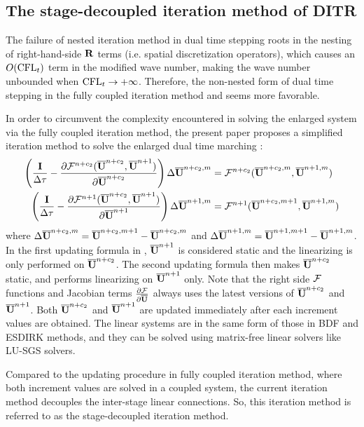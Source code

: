 \subsection{The stage-decoupled iteration method of DITR}

The failure of nested iteration method in dual time stepping
roots in the nesting of right-hand-side $\mathbf{R}$ terms
(i.e. spatial  discretization operators), which
causes an $O(\text{CFL}_t)$ term in the modified wave number,
making the wave number unbounded when $\text{CFL}_t\rightarrow + \infty$.
Therefore, the non-nested form of dual time stepping in
the fully coupled iteration method  and 
seems more favorable.

In order to circumvent the complexity encountered in solving the enlarged
system via the fully coupled iteration method, the present paper
proposes a simplified iteration method to solve the enlarged dual time marching
:
\begin{equation}
    \begin{aligned}
        \left(\frac{\eye}{\inc\tau} -
        \partialderivative{\FF^{n+c_2}(\uu^{n+c_2}, \uu^{n+1})}{\uu^{n+c_2}}  \right)
        \inc\uu^{n+c_2,m} & = \FF^{n+c_2}(\uu^{n+c_2,m}, \uu^{n+1,m}) \\
        \left(\frac{\eye}{\inc\tau} -
        \partialderivative{\FF^{n+1}(\uu^{n+c_2}, \uu^{n+1})}{\uu^{n+1}}  \right)
        \inc\uu^{n+1,m}   & = \FF^{n+1}(\uu^{n+c_2,m+1}, \uu^{n+1,m}) \\
    \end{aligned}
    \label{eq:DITRSDS}
\end{equation}
where ${\Delta} \overline{\mathbf{U}}^{n+c_2,m} = \overline{\mathbf{U}}^{n+c_2,m+1} - \overline{\mathbf{U}}^{n+c_2,m}$ and
${\Delta} \overline{\mathbf{U}}^{n+1,m} = \overline{\mathbf{U}}^{n+1,m+1} - \overline{\mathbf{U}}^{n+1,m}$.
In the first updating formula in ,
$\overline{\mathbf{U}}^{n+1}$ is considered static and the linearizing is only
performed on $\overline{\mathbf{U}}^{n+c_2}$. The second updating formula
then makes $\overline{\mathbf{U}}^{n+c_2}$ static, and performs linearizing on
$\overline{\mathbf{U}}^{n+1}$ only. Note that the right side $\mathcal{F}$ functions
and Jacobian terms $\partialderivative{\FF}{\uu}$ always
uses the latest versions of $\overline{\mathbf{U}}^{n+c_2}$ and $\overline{\mathbf{U}}^{n+1}$.
Both $\overline{\mathbf{U}}^{n+c_2}$ and $\overline{\mathbf{U}}^{n+1}$ are updated immediately
after each increment values are obtained.
The linear systems are in the same form
of those in BDF and ESDIRK methods, and they
can be solved using matrix-free linear solvers like
LU-SGS solvers.

Compared to the updating procedure in fully coupled iteration method,
where both increment values are solved in a coupled system,
the current iteration method decouples the inter-stage linear connections.
So, this iteration method is referred to as the stage-decoupled iteration method.

